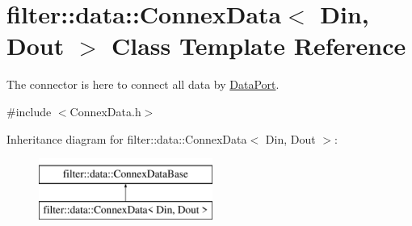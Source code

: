 \hypertarget{classfilter_1_1data_1_1_connex_data}{}\section{filter\+:\+:data\+:\+:Connex\+Data$<$ Din, Dout $>$ Class Template Reference}
\label{classfilter_1_1data_1_1_connex_data}


The connector is here to connect all data by \hyperlink{classfilter_1_1data_1_1_data_port}{Data\+Port}.  




{\ttfamily \#include $<$Connex\+Data.\+h$>$}

Inheritance diagram for filter\+:\+:data\+:\+:Connex\+Data$<$ Din, Dout $>$\+:\begin{figure}[H]
\begin{center}
\leavevmode
\includegraphics[height=2.000000cm]{dc/d36/classfilter_1_1data_1_1_connex_data}
\end{center}
\end{figure}
